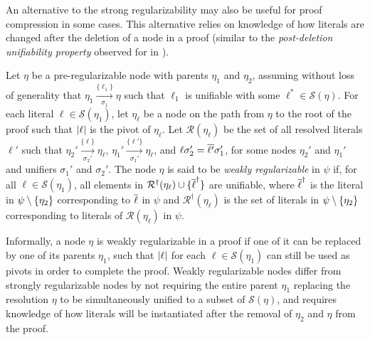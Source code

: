 An alternative to the strong regularizability may also be useful for proof compression in some cases. This alternative relies on knowledge of how literals are changed after the deletion of a node in a proof (similar to the \emph{post-deletion unifiability property} observed for {\FOLowerUnits} in \cite{GFOLU}).  
\begin{definition}\label{def:postdelprop}
Let $\eta$ be a pre-regularizable node with parents $\eta_1$ and $\eta_2$, assuming without loss of generality that $\eta_1 \xrightarrow[\sigma_1]{\{\ell_1\} } \eta$ 
such that $\ell_1$ is unifiable with some $\ell^* \in \mathcal{S}(\eta)$.
For each literal $\ell \in \mathcal{S}(\eta_1)$, let $\eta_\ell$ be a node on the path from $\eta$ to the root of the proof such that $\lvert\ell\rvert$ is the pivot of $\eta_\ell$.
Let $\mathcal{R}(\eta_\ell)$ be the set of all resolved literals $\ell'$ such that $\eta_2' \xrightarrow[\sigma_2']{\{\ell\} } \eta_\ell$, $\eta_1' \xrightarrow[\sigma_1']{\{\ell'\} } \eta_\ell$, and $\ell\sigma_2'=\overline{\ell'}\sigma_1'$, for some nodes $\eta_2'$ and $\eta_1'$ and unifiers $\sigma_1'$ and $\sigma_2'$.
The node $\eta$ is said to be \emph{weakly regularizable} in $\psi$ if, for all $\ell \in \mathcal{S}(\eta_1)$, all elements in $\mathcal{R}^{\dagger}(\eta_\ell) \cup \{ \overline{\ell}^\dagger \}$ are unifiable, where $\overline{\ell}^{\dagger}$ is the literal in $\psi \setminus \{\eta_2\}$ corresponding to $\overline{\ell}$ in $\psi$ and $\mathcal{R}^{\dagger}(\eta_\ell)$ is the set of literals in $\psi \setminus \{\eta_2\}$ corresponding to literals of $\mathcal{R}(\eta_\ell)$ in $\psi$.
\end{definition}




Informally, a node $\eta$ is weakly regularizable in a proof if one of it can be replaced by one of its parents $\eta_1$, such that $\lvert\ell\rvert$ for each $\ell \in \mathcal{S}(\eta_1)$ can still be used as pivots in order to complete the proof. Weakly regularizable nodes differ from strongly regularizable nodes by not requiring the entire parent $\eta_1$ replacing the resolution $\eta$ to be simultaneously unified to a subset of $\mathcal{S}(\eta)$, and requires knowledge of how literals will be instantiated after the removal of $\eta_2$ and $\eta$ from the proof.

